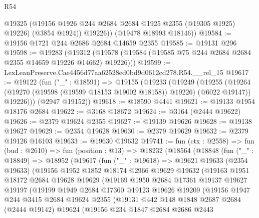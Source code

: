 \begin{lexlean}{R54}
\begin{coremodule}
            @19325
            (@19156 @1926 @244 @2684 @2684 @1925 @2355 (@19305 @1925) @19226)
            (@3854 @1924))
          @19226))
      (@19478 @18993 @18146))
@19584 := @19156 @1721 @244 @2686 @2684 @14659 @2355
@19585 := @19131 @296
@19598 := @19283
    (@19312 (@19578 (@19584 (@19585 @75 @244 @2684 @2684 @2355 @14659 @19226 @14662) @19226)))
@19599 := LexLeanPreserve.Cae4456d77aa62528ed0bd9d0612cd278.R54.__rel_15
@19617 := @19122
    (fun ("_" : @18591) =>
    @19155
      (@19233
        (@19249
          (@19255
            (@19264 (@19270 (@19598 (@19599 @18153 @19002 @18158)) @19226) (@6022 @19147))
            @19226)))
      (@2947 @19152))
@19618 := @18590 @4441
@19621 := @19133 @1954 @18176 @2684
@19622 := @3168 @18672
@19624 := @3164 (@2444 @19622)
@19626 := @2379 @19624 @2355
@19627 := @19139 @19626
@19628 := @19138 @19627
@19629 := @2354 @19628
@19630 := @2379 @19629
@19632 := @2379 @19126 @16103
@19633 := @19630 @19632
@19741 := fun (ctx : @2558) =>
  fun (bud : @2610) =>
  fun (position : @13) =>
  @18232
    (@18564
      (@18848
        (fun ("_" : @18849) =>
        @18952
          (@19617
            (fun ("_" : @19618) =>
            @19621
              @19633
              (@2354 @19633)
              (@19156
                @1952
                @1852
                @18174
                @2966
                @19629
                @19632
                (@19163
                  @1951
                  @18172
                  @2684
                  @19628
                  @19629
                  (@19169
                    @1950
                    @2684
                    @17361
                    @19137
                    @19627
                    @19197
                    (@19199
                      @1949
                      @2684
                      @17360
                      @19123
                      @19626
                      @19209
                      (@19156
                        @1947
                        @244
                        @3415
                        @2684
                        @19624
                        @2355
                        (@19131
                          @442
                          @148
                          @1848
                          @2687
                          @2684
                          (@2444 @19142)
                          @19624
                          (@19156
                            @234
                            @1847
                            @2684
                            @2686
                            @2443

\end{coremodule}
\end{lexlean}
